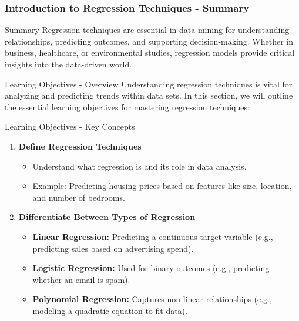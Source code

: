 \documentclass[aspectratio=169]{beamer}
\begin{document}
\begin{frame}[fragile]
    \frametitle{Introduction to Regression Techniques - Summary}
    \begin{block}{Summary}
        Regression techniques are essential in data mining for understanding relationships, predicting outcomes, and supporting decision-making. Whether in business, healthcare, or environmental studies, regression models provide critical insights into the data-driven world.
    \end{block}
\end{frame}

\begin{frame}[fragile]{Learning Objectives - Overview}
    Understanding regression techniques is vital for analyzing and predicting trends within data sets. In this section, we will outline the essential learning objectives for mastering regression techniques:
\end{frame}

\begin{frame}[fragile]{Learning Objectives - Key Concepts}
    \begin{enumerate}
        \item \textbf{Define Regression Techniques}
            \begin{itemize}
                \item Understand what regression is and its role in data analysis.
                \item Example: Predicting housing prices based on features like size, location, and number of bedrooms.
            \end{itemize}
        
        \item \textbf{Differentiate Between Types of Regression}
            \begin{itemize}
                \item \textbf{Linear Regression:} Predicting a continuous target variable (e.g., predicting sales based on advertising spend).
                \item \textbf{Logistic Regression:} Used for binary outcomes (e.g., predicting whether an email is spam).
                \item \textbf{Polynomial Regression:} Captures non-linear relationships (e.g., modeling a quadratic equation to fit data).
            \end{itemize}
    \end{enumerate}
\end{frame}
\end{document}
